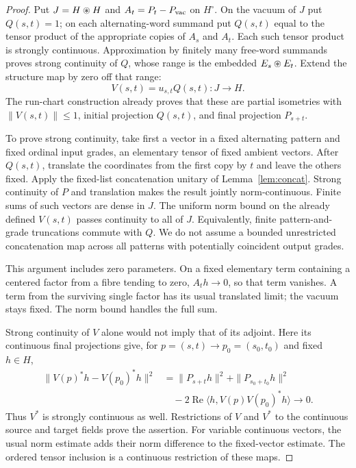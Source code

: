 \documentclass[11pt]{article}
\theoremstyle{remark}\newtheorem{remark}[theorem]{Remark}
\begin{document}
\begin{proof}
Put $J=H\mathbin{\circledast} H$ and $A_t=P_t-P_{\rm vac}$ on $H^\circ$.
On the vacuum of $J$ put $Q(s,t)=1$; on each alternating-word summand put
$Q(s,t)$ equal to the tensor product of the appropriate copies of $A_s$ and
$A_t$. Each such tensor product is strongly continuous. Approximation by
finitely many free-word summands proves strong continuity of $Q$, whose range
is the embedded $E_s\mathbin{\circledast} E_t$. Extend the structure map by zero off that range:
\[
 V(s,t)=u_{s,t}Q(s,t):J\longrightarrow H.
\]
The run-chart construction already proves that these are partial isometries
with $\|V(s,t)\|\leq1$, initial projection $Q(s,t)$, and final projection
$P_{s+t}$.

To prove strong continuity, take first a vector in a fixed alternating pattern
and fixed ordinal input grades, an elementary tensor of fixed ambient vectors.
After $Q(s,t)$, translate the coordinates from the first copy by $t$ and leave
the others fixed. Apply the fixed-list concatenation unitary of
Lemma~\ref{lem:concat}. Strong continuity of $P$ and translation makes the
result jointly norm-continuous. Finite sums of such vectors are dense in
$J$. The uniform norm bound on the already defined $V(s,t)$ passes continuity
to all of $J$. Equivalently, finite pattern-and-grade truncations commute with
$Q$. We do not assume a bounded unrestricted concatenation map across all
patterns with potentially coincident output grades.

This argument includes zero parameters. On a fixed elementary term containing
a centered factor from a fibre tending to zero, $A_th\to0$, so that term
vanishes. A term from the surviving single factor has its usual translated
limit; the vacuum stays fixed. The norm bound handles the full sum.

Strong continuity of $V$ alone would not imply that of its adjoint. Here its
continuous final projections give, for $p=(s,t)\to p_0=(s_0,t_0)$ and fixed
$h\in H$,
\begin{align*}
 \|V(p)^*h-V(p_0)^*h\|^2
 &=\|P_{s+t}h\|^2+\|P_{s_0+t_0}h\|^2\\
 &\quad-2\operatorname{Re}\langle h,V(p)V(p_0)^*h\rangle\longrightarrow0.
\end{align*}
Thus $V^*$ is strongly continuous as well. Restrictions of $V$ and $V^*$ to
the continuous source and target fields prove the assertion. For variable
continuous vectors, the usual norm estimate adds their norm difference to
the fixed-vector estimate. The ordered tensor inclusion is a continuous
restriction of these maps.
\end{proof}
\end{document}
